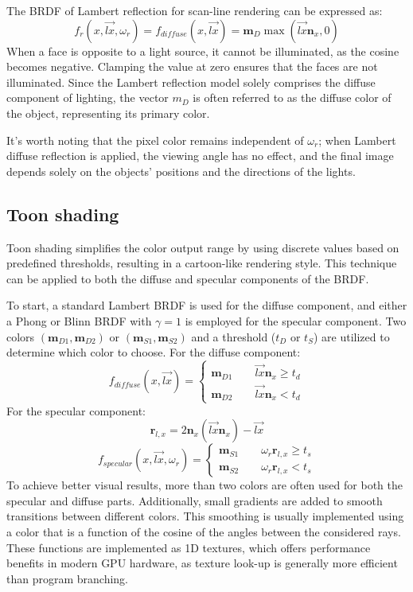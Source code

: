 The BRDF of Lambert reflection for scan-line rendering can be expressed as:
\[f_r(x,\overrightarrow{lx},\omega_r)=f_{diffuse}(x,\overrightarrow{lx})=\mathbf{m}_D\max(\overrightarrow{lx}\mathbf{n}_x,0)\]
When a face is opposite to a light source, it cannot be illuminated, as the cosine becomes negative. 
Clamping the value at zero ensures that the faces are not illuminated. 
Since the Lambert reflection model solely comprises the diffuse component of lighting, the vector $m_D$ is often referred to as the diffuse color of the object, representing its primary color.

It's worth noting that the pixel color remains independent of $\omega_r$; when Lambert diffuse reflection is applied, the viewing angle has no effect, and the final image depends solely on the objects' positions and the directions of the lights.

\subsection{Toon shading}
Toon shading simplifies the color output range by using discrete values based on predefined thresholds, resulting in a cartoon-like rendering style. 
This technique can be applied to both the diffuse and specular components of the BRDF.

To start, a standard Lambert BRDF is used for the diffuse component, and either a Phong or Blinn BRDF with $\gamma=1$ is employed for the specular component.
Two colors $(\textbf{m}_{D1} , \textbf{m}_{D2})$ or $(\textbf{m}_{S1} , \textbf{m}_{S2})$ and a threshold ($t_D$ or $t_S$) are utilized to determine which color to choose.
For the diffuse component:
\[f_{diffuse}(x,\overrightarrow{lx})=\begin{cases}
    \mathbf{m}_{D1}\qquad\overrightarrow{lx}\mathbf{n}_x\geq t_d \\
    \mathbf{m}_{D2}\qquad\overrightarrow{lx}\mathbf{n}_x< t_d
\end{cases}\]
For the specular component:
\[\mathbf{r}_{l,x}=2\mathbf{n}_x\left(\overrightarrow{lx}\mathbf{n}_x\right)-\overrightarrow{lx}\]
\[f_{specular}(x,\overrightarrow{lx},\omega_r)=\begin{cases}
    \mathbf{m}_{S1}\qquad\omega_r\mathbf{r}_{l,x}\geq t_s \\
    \mathbf{m}_{S2}\qquad\omega_r\mathbf{r}_{l,x}< t_s
\end{cases}\]
To achieve better visual results, more than two colors are often used for both the specular and diffuse parts. 
Additionally, small gradients are added to smooth transitions between different colors. 
This smoothing is usually implemented using a color that is a function of the cosine of the angles between the considered rays. 
These functions are implemented as 1D textures, which offers performance benefits in modern GPU hardware, as texture look-up is generally more efficient than program branching.

